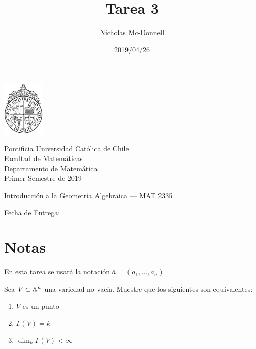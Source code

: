 

\title{Tarea 3}
\author{Nicholas Mc-Donnell}
\date{2019/04/26}



\begin{minipage}{2.5cm}
    \includegraphics[width=2cm]{../../figures/logo1.jpg}
\end{minipage}
\begin{minipage}{13cm}
    \begin{flushleft}
        \raggedright{
            \noindent
            {\sc Pontificia Universidad Católica de Chile\\
                Facultad de Matemáticas\\
                Departamento de Matemática} \smallskip \\
            Primer Semestre de 2019\\
        }
    \end{flushleft}
\end{minipage}

\vspace{2ex}
{\Large \centerline{\bf \thetitle}}
{\large \centerline{Introducción a la Geometría Algebraica --- MAT 2335}}
{\normalsize \centerline{ Fecha de Entrega: \thedate}}
\vfill

\begin{flushright}
    {\large\theauthor}
\end{flushright}
\newpage
\normalsize
{}
\tableofcontents
\newpage

\section*{Notas}
En esta tarea se usará la notación \(\overline{a}=(a_1,\dots ,a_n)\)\\

\begin{prob}{2.4}
    Sea \(V\subset\mathbb{A}^n\) una variedad no vacía. Muestre que los siguientes son equivalentes:
    \begin{enumerate}[label= (\roman*)]
        \item \(V\) es un punto
        \item \(\Gamma(V)=k\)
        \item \(\dim_k\Gamma(V)<\infty\)
    \end{enumerate}
\end{prob}

